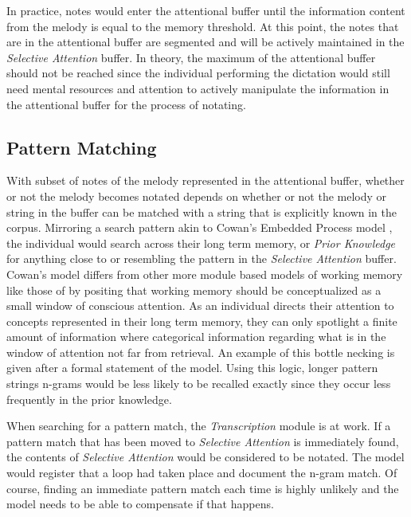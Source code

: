 \documentclass[]{book}
\theoremstyle{definition}
\theoremstyle{definition}
\theoremstyle{definition}
\theoremstyle{remark}
\begin{document}
In practice, notes would enter the attentional buffer until the
information content from the melody is equal to the memory threshold. At
this point, the notes that are in the attentional buffer are segmented
and will be actively maintained in the \emph{Selective Attention}
buffer. In theory, the maximum of the attentional buffer should not be
reached since the individual performing the dictation would still need
mental resources and attention to actively manipulate the information in
the attentional buffer for the process of notating.

\hypertarget{pattern-matching}{%
\subsection{Pattern Matching}\label{pattern-matching}}

With subset of notes of the melody represented in the attentional
buffer, whether or not the melody becomes notated depends on whether or
not the melody or string in the buffer can be matched with a string that
is explicitly known in the corpus. Mirroring a search pattern akin to
Cowan's Embedded Process model
\citep{cowanEvolvingConceptionsMemory1988, cowanMagicalMysteryFour2010},
the individual would search across their long term memory, or
\emph{Prior Knowledge} for anything close to or resembling the pattern
in the \emph{Selective Attention} buffer. Cowan's model differs from
other more module based models of working memory like those of
\citet{baddeleyWorkingMemory1974} by positing that working memory should
be conceptualized as a small window of conscious attention. As an
individual directs their attention to concepts represented in their long
term memory, they can only spotlight a finite amount of information
where categorical information regarding what is in the window of
attention not far from retrieval. An example of this bottle necking is
given after a formal statement of the model. Using this logic, longer
pattern strings n-grams would be less likely to be recalled exactly
since they occur less frequently in the prior knowledge.

When searching for a pattern match, the \emph{Transcription} module is
at work. If a pattern match that has been moved to \emph{Selective
Attention} is immediately found, the contents of \emph{Selective
Attention} would be considered to be notated. The model would register
that a loop had taken place and document the n-gram match. Of course,
finding an immediate pattern match each time is highly unlikely and the
model needs to be able to compensate if that happens.
\end{document}
